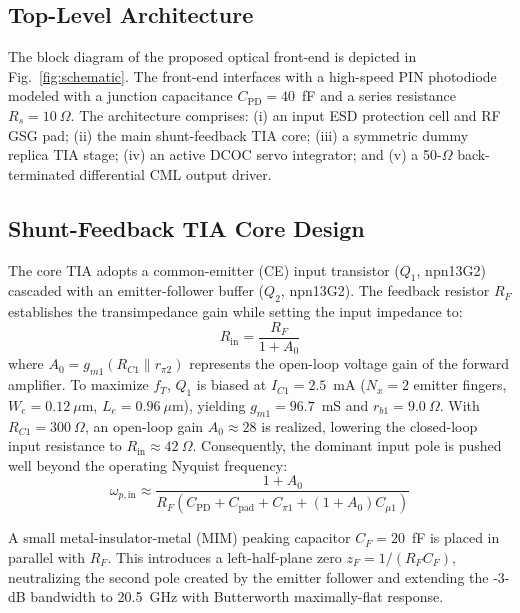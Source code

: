 \documentclass[conference]{IEEEtran}
\begin{document}
\subsection{Top-Level Architecture}
The block diagram of the proposed optical front-end is depicted in Fig.~\ref{fig:schematic}. The front-end interfaces with a high-speed PIN photodiode modeled with a junction capacitance $C_{\text{PD}} = 40$~fF and a series resistance $R_s = 10~\Omega$. The architecture comprises: (i) an input ESD protection cell and RF GSG pad; (ii) the main shunt-feedback TIA core; (iii) a symmetric dummy replica TIA stage; (iv) an active DCOC servo integrator; and (v) a 50-$\Omega$ back-terminated differential CML output driver.

\subsection{Shunt-Feedback TIA Core Design}
The core TIA adopts a common-emitter (CE) input transistor ($Q_1$, npn13G2) cascaded with an emitter-follower buffer ($Q_2$, npn13G2). The feedback resistor $R_F$ establishes the transimpedance gain while setting the input impedance to:
\begin{equation}
R_{\text{in}} = \frac{R_F}{1 + A_0}
\end{equation}
where $A_0 = g_{m1} (R_{C1} \parallel r_{\pi 2})$ represents the open-loop voltage gain of the forward amplifier. To maximize $f_T$, $Q_1$ is biased at $I_{C1} = 2.5$~mA ($N_x = 2$ emitter fingers, $W_e = 0.12~\mu\text{m}$, $L_e = 0.96~\mu\text{m}$), yielding $g_{m1} = 96.7$~mS and $r_{b1} = 9.0~\Omega$. With $R_{C1} = 300~\Omega$, an open-loop gain $A_0 \approx 28$ is realized, lowering the closed-loop input resistance to $R_{\text{in}} \approx 42~\Omega$. Consequently, the dominant input pole is pushed well beyond the operating Nyquist frequency:
\begin{equation}
\omega_{p,\text{in}} \approx \frac{1 + A_0}{R_F (C_{\text{PD}} + C_{\text{pad}} + C_{\pi 1} + (1+A_0)C_{\mu 1})}
\end{equation}

A small metal-insulator-metal (MIM) peaking capacitor $C_F = 20$~fF is placed in parallel with $R_F$. This introduces a left-half-plane zero $z_F = 1/(R_F C_F)$, neutralizing the second pole created by the emitter follower and extending the -3-dB bandwidth to 20.5~GHz with Butterworth maximally-flat response.
\end{document}
